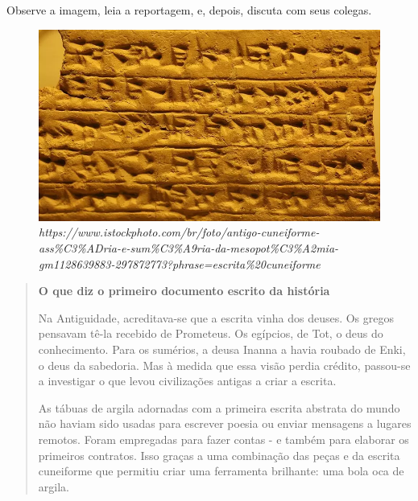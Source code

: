 


Observe a imagem, leia a reportagem, e, depois, discuta com seus colegas.

\begin{figure}[htpb!]
\includegraphics[width=.5\textwidth]{./imgs/img31.png}
\caption{\emph{https://www.istockphoto.com/br/foto/antigo-cuneiforme-ass\%C3\%ADria-e-sum\%C3\%A9ria-da-mesopot\%C3\%A2mia-gm1128639883-297872773?phrase=escrita\%20cuneiforme}}
\end{figure}

\begin{quote}
\textbf{O que diz o primeiro documento escrito da história}

Na Antiguidade, acreditava-se que a escrita vinha dos deuses. Os gregos
pensavam tê-la recebido de Prometeus. Os egípcios, de Tot, o deus do
conhecimento. Para os sumérios, a deusa Inanna a havia roubado de Enki,
o deus da sabedoria. Mas à medida que essa visão perdia crédito,
passou-se a investigar o que levou civilizações antigas a criar a
escrita.

As tábuas de argila adornadas com a primeira escrita abstrata do mundo
não haviam sido usadas para escrever poesia ou enviar mensagens a
lugares remotos. Foram empregadas para fazer contas - e também para
elaborar os primeiros contratos. Isso graças a uma combinação das peças
e da escrita cuneiforme que permitiu criar uma ferramenta brilhante: uma
bola oca de argila.

\end{quote}

